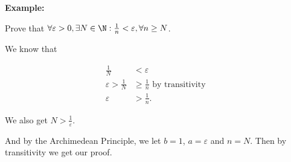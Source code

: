\textbf{Example:}

Prove that \(\forall \varepsilon > 0, \exists N \in \N: \frac{1}{n} < \varepsilon, \forall n \ge N\).

We know that 

\begin{align*}
	\frac{1}{N} &< \varepsilon \\ 
	\varepsilon > \frac{1}{N} &\ge \frac{1}{n} \text{ by transitivity } \\ 
	\varepsilon &> \frac{1}{n}.
\end{align*}

We also get \(N > \frac{1}{\varepsilon}\).

And by the Archimedean Principle, we let \(b = 1\), \(a = \varepsilon\) and \(n = N\). Then by 
transitivity we get our proof.

\QED

